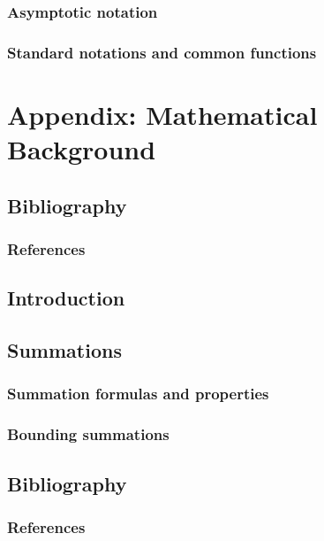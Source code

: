 \documentclass[letterpaper]{book}
\begin{document}
	\section{Asymptotic notation}
	\Blindtext
	\newpage

	\section{Standard notations and common functions}
	\Blindtext
	\newpage

	\part{Appendix: Mathematical Background}

	\appendix
	\chapter{Bibliography}
	\section{References}
	\Blindtext
	\newpage

	\chapter*{Introduction}

	\chapter*{Summations}
	\section{Summation formulas and properties}
	\section{Bounding summations}
	\Blindtext
	\newpage

	\backmatter
	\chapter{Bibliography}
	\section{References}
	\Blindtext
	\newpage
\end{document}
